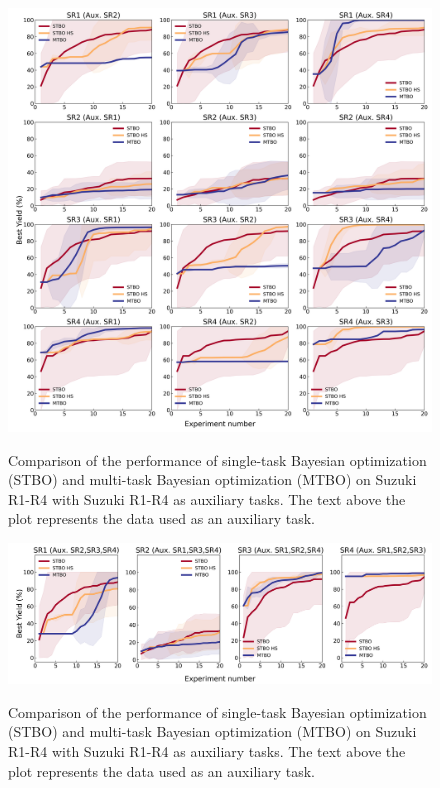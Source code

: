 \begin{figure}
\caption{Comparison of the performance of single-task Bayesian optimization (STBO) and multi-task Bayesian optimization (MTBO) on Suzuki R1-R4 with Suzuki R1-R4 as auxiliary tasks. The text above the plot represents the data used as an auxiliary task.}\includegraphics[width=1\textwidth]{gfx/Appendix/reizman_suzuki_reizman_suzuki_one_cotraining_optimization.png}
\label{fig:11}
\end{figure}

\begin{figure}
\caption{Comparison of the performance of single-task Bayesian optimization (STBO) and multi-task Bayesian optimization (MTBO) on Suzuki R1-R4 with Suzuki R1-R4 as auxiliary tasks. The text above the plot represents the data used as an auxiliary task.}\includegraphics[width=1\textwidth]{gfx/Appendix/reizman_suzuki_baumgartner_suzuki_all_cotraining_optimization.png}
\label{fig:12}
\end{figure}

